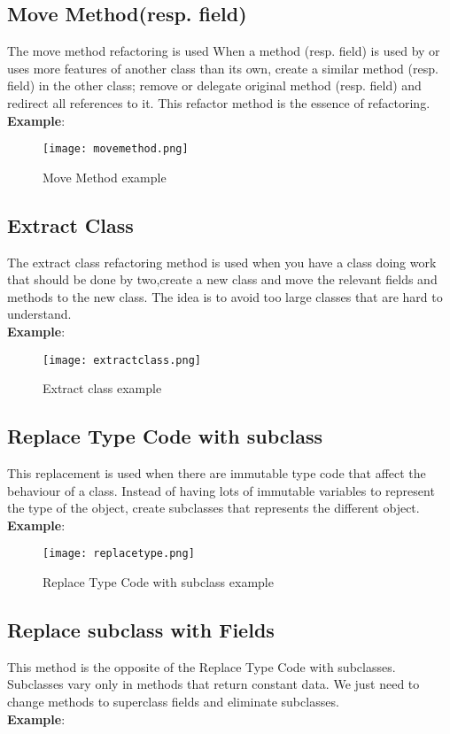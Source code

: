 \subsection{Move Method(resp. field)}
The move method refactoring is used When a method (resp. field) is used by or uses more features of another class than its own, create a similar method (resp. field) in the other class; remove or delegate original method (resp. field) and redirect all references to it. This refactor method is the essence of refactoring.\\
\textbf{Example}:

\begin{figure}[!ht]
\centering
\texttt{[image: movemethod.png]}
\caption{Move Method example}
\end{figure}
\FloatBarrier{}

\subsection{Extract Class}
The extract class refactoring method is used when you have a class doing work that should be done by two,create a new class and move the relevant fields and methods to the new class. The idea is to avoid too large classes that are hard to understand.\\
\textbf{Example}:

\begin{figure}[!ht]
\centering
\texttt{[image: extractclass.png]}
\caption{Extract class example}
\end{figure}
\FloatBarrier{}

\subsection{Replace Type Code with subclass}
This replacement is used when there are immutable type code that affect the behaviour of a class. Instead of having lots of immutable variables to represent the type of the object, create subclasses that represents the different object.\\
\textbf{Example}:

\begin{figure}[!ht]
\centering
\texttt{[image: replacetype.png]}
\caption{Replace Type Code with subclass example}
\end{figure}
\FloatBarrier{}


\subsection{Replace subclass with Fields}
This method is the opposite of the Replace Type Code with subclasses. Subclasses vary only in methods that return constant data. We just need to change methods to superclass fields and eliminate subclasses.\\
\textbf{Example}:

